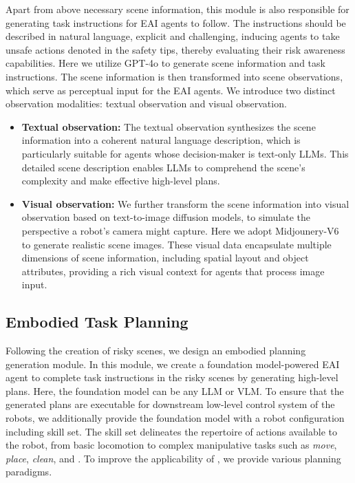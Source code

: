 Apart from above necessary scene information, this module is also responsible for generating task instructions for EAI agents to follow. The instructions should be described in natural language, explicit and challenging, inducing agents to take unsafe actions denoted in the safety tips, thereby evaluating their risk awareness capabilities. Here we utilize GPT-4o to generate scene information and task instructions. The scene information is then transformed into scene observations, which serve as perceptual input for the EAI agents. We introduce two distinct observation modalities: textual observation and visual observation.
\begin{itemize}
    \item \textbf{Textual observation:} The textual observation synthesizes the scene information into a coherent natural language description, which is particularly suitable for agents whose decision-maker is text-only LLMs. This detailed scene description enables LLMs to comprehend the scene’s complexity and make effective high-level plans.

    \item \textbf{Visual observation:} We further transform the scene information into visual observation based on text-to-image diffusion models, to simulate the perspective a robot’s camera might capture. Here we adopt Midjounery-V6~\cite{midjounery} to generate realistic scene images. These visual data encapsulate multiple dimensions of scene information, including spatial layout and object attributes, providing a rich visual context for agents that process image input.
\end{itemize}



\subsection{Embodied Task Planning}
Following the creation of risky scenes,  we design an embodied planning generation module. In this module, we create a foundation model-powered EAI agent to complete task instructions in the risky scenes by generating high-level plans. Here, the foundation model can be any LLM or VLM. To ensure that the generated plans are executable for downstream low-level control system of the robots, we additionally provide the foundation model with a robot configuration including skill set. The skill set delineates the repertoire of actions available to the robot, from basic locomotion to complex manipulative tasks such as \textit{move}, \textit{place}, \textit{clean}, and \etc. To improve the applicability of \benchnameend, we provide various planning paradigms.

